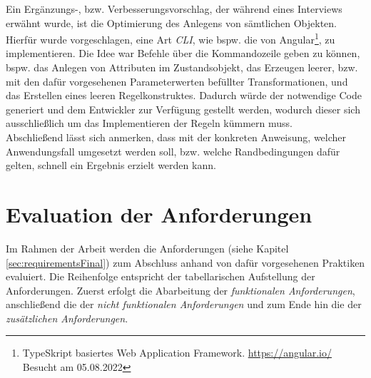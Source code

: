         Ein Ergänzungs-, bzw. Verbesserungsvorschlag, der während eines Interviews erwähnt wurde, ist die Optimierung des Anlegens von sämtlichen Objekten. 
        Hierfür wurde vorgeschlagen, eine Art \textit{\ac{CLI}}, wie bspw. die von Angular\footnote{TypeSkript basiertes Web Application Framework. \url{https://angular.io/} Besucht am 05.08.2022}, 
        zu implementieren. Die Idee war Befehle über die Kommandozeile geben zu können, bspw. das Anlegen von Attributen im Zustandsobjekt, das Erzeugen leerer, bzw. mit den dafür 
        vorgesehenen Parameterwerten befüllter Transformationen, und das Erstellen eines leeren Regelkonstruktes. Dadurch würde der notwendige Code generiert und dem Entwickler zur Verfügung gestellt werden, wodurch dieser 
        sich ausschließlich um das Implementieren der Regeln kümmern muss. 
        \\
        \linebreak
        Abschließend lässt sich anmerken, dass mit der konkreten Anweisung, welcher Anwendungsfall umgesetzt werden soll, bzw. welche Randbedingungen 
        dafür gelten, schnell ein Ergebnis erzielt werden kann. 
        
\section{Evaluation der Anforderungen}
    Im Rahmen der Arbeit werden die Anforderungen (siehe Kapitel \ref{sec:requirementsFinal}) zum Abschluss anhand von dafür vorgesehenen Praktiken evaluiert. 
    Die Reihenfolge entspricht der tabellarischen Aufstellung der Anforderungen. Zuerst erfolgt die Abarbeitung der \textit{funktionalen Anforderungen}, 
    anschließend die der \textit{nicht funktionalen Anforderungen} und zum Ende hin die der \textit{zusätzlichen Anforderungen}. 
    
